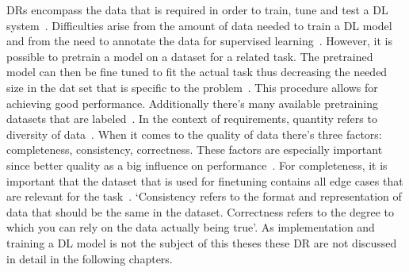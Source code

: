 \acp{DR} encompass the data that is required in order to train, tune and test a \ac{DL}
system~\cite{vogelsang_requirements_2019}.
Difficulties arise from the amount of data needed to train a \ac{DL} model and from the need to
annotate the data for supervised learning~\cite{nowruzi_how_2019}.
However, it is possible to pretrain a model on a dataset for a related task.
The pretrained model can then be fine tuned to fit the actual task thus decreasing the needed size
in the dat set that is specific to the problem~\cite{ouyang_factors_2016}.
This procedure allows for achieving good performance.
Additionally there's many available pretraining datasets that are labeled~\cite{ouyang_factors_2016}.
In the context of requirements, quantity refers to diversity of data~\cite{vogelsang_requirements_2019}.
When it comes to the quality of data there's three factors: completeness, consistency,
correctness.
These factors are especially important since better quality as a big influence on
performance~\cite{vogelsang_requirements_2019}.
For completeness, it is important that the dataset that is used for finetuning contains all edge
cases that are relevant for the task~\cite{arpteg_software_2018, vogelsang_requirements_2019}.
`Consistency refers to the format and representation of data that should be the same in the dataset. Correctness refers to the degree to which you can rely on the data actually being
true'\cite{vogelsang_requirements_2019}.
As implementation and training a \ac{DL} model is not the subject of this theses these \ac{DR} are
not discussed in detail in the following chapters.

